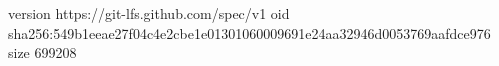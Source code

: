 version https://git-lfs.github.com/spec/v1
oid sha256:549b1eeae27f04c4e2cbe1e01301060009691e24aa32946d0053769aafdce976
size 699208
